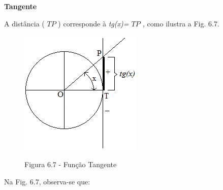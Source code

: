\begin{caixa}
\textbf{Tangente }
\begin{multicols}{2}

A distância ( \( TP \) ) corresponde à \textit{tg(x)= \(  TP \) , }como ilustra a Fig. 6.7.

\begin{figure}[H]
    \begin{Center}
        \includegraphics[width=2.3in,height=2.35in]{capitulos/trigonometria_e_funcoes_trigonometricas/media/image36.png}

        Figura 6.7 - Função Tangente
    \end{Center}
\end{figure}

\end{multicols}
\end{caixa}

Na Fig. 6.7, observa-se que:

